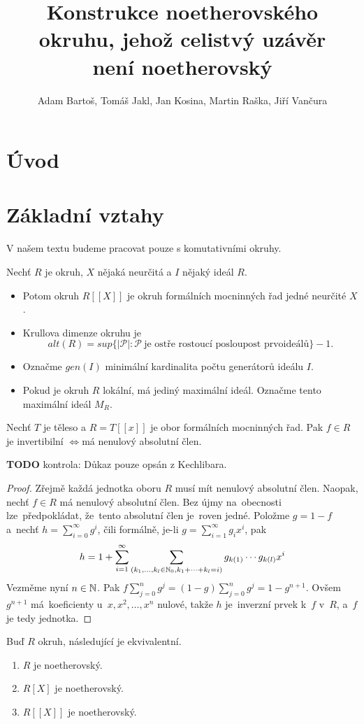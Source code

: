 \documentclass[11pt,a4paper]{article}
\title{Konstrukce noetherovského okruhu, jehož celistvý uzávěr\\ není
	noetherovský}
\author{Adam Bartoš, Tomáš Jakl, Jan Kosina, Martin Raška, Jiří Vančura}
\newcommand\p[1]{\mathcal{ #1 }} %
\newcommand\IFF{\ensuremath{\iff}}
\theoremstyle{definition}
\theoremstyle{plain}
\begin{document}
\maketitle
\section{Úvod}

\section{Základní vztahy}
V našem textu budeme pracovat pouze s komutativními okruhy.

 Nechť $R$ je okruh, $X$ nějaká neurčitá a $I$ nějaký ideál $R$.
\begin{itemize}
	\item Potom okruh $R[[X]]$ je okruh formálních mocninných řad jedné
	neurčité $X$.
	\item Krullova dimenze okruhu je $$alt(R) = sup \{ |\p P| : \p P~\text{je
	ostře rostoucí posloupost prvoideálů} \} - 1.$$
	\item Označme $gen(I)$ minimální kardinalita počtu generátorů ideálu $I$.
	\item Pokud je okruh $R$ lokální, má jediný maximální ideál. Označme tento
	maximální ideál $M_R$.
\end{itemize}

\veta Nechť $T$ je těleso a $R = T[[x]]$ je obor formálních mocninných řad. Pak
$f \in R$ je invertibilní \IFF má nenulový absolutní člen.

\textbf{TODO} kontrola: Důkaz pouze opsán z Kechlibara.

\begin{proof}
	Zřejmě každá jednotka oboru $R$ musí mít nenulový absolutní člen. Naopak,
	nechť $f\in R$ má nenulový absolutní člen. Bez újmy na~obecnosti
	lze~před\-po\-klá\-dat, že~tento absolutní člen je~roven jedné. Položme $g=
	1-f$ a~nechť $h =  \sum_{i= 0}^\infty g^i$, čili formálně, je-li $g=
	\sum_{i= 1}^\infty g_ix^i$, pak $$h= 1+\sum_{i= 1}^\infty
	\sum_{(k_1,\dots,k_l\in \Bbb N_0, k_1+\dots+k_l= i)} g_{k(1)}\cdots
	g_{k(l)}x^i$$ Vezměme nyní $n\in \Bbb N$. Pak $f\sum_{j= 0}^n g^j =
	(1-g)\sum_{j= 0}^n g^j =  1 - g^{n+1}$. Ovšem $g^{n+1}$ má~koeficienty
	u~$x,x^2,\dots,x^n$ nulové, takže $h$ je~inverzní prvek k~$f$ v~$R$, a~$f$
	je tedy jednotka.
\end{proof}

 Buď $R$ okruh, následující je ekvivalentní.
\begin{enumerate}
	\item $R$ je noetherovský.
	\item $R[X]$ je noetherovský.
	\item $R[[X]]$ je noetherovský.
\end{enumerate}
\end{document}
